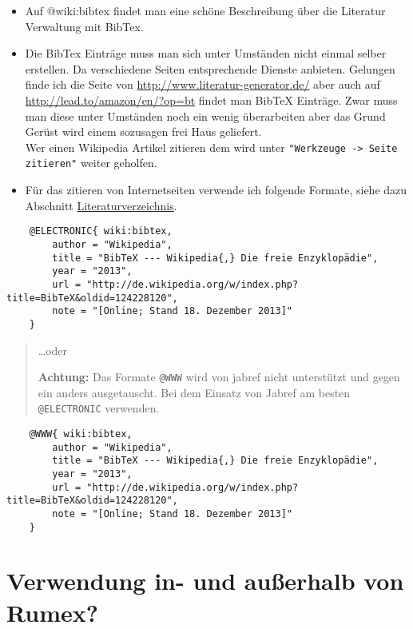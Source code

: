 \begin{itemize}
\item
  Auf @wiki:bibtex findet man eine schöne Beschreibung über die
  Literatur Verwaltung mit BibTex.
\item
  Die BibTex Einträge muss man sich unter Umständen nicht einmal selber
  erstellen. Da verschiedene Seiten entsprechende Dienste anbieten.
  Gelungen finde ich die Seite von
  \url{http://www.literatur-generator.de/} aber auch auf
  \url{http://lead.to/amazon/en/?op=bt} findet man BibTeX Einträge. Zwar
  muss man diese unter Umständen noch ein wenig überarbeiten aber das
  Grund Gerüst wird einem sozusagen frei Haus geliefert.\\Wer einen
  Wikipedia Artikel zitieren dem wird unter
  \texttt{"Werkzeuge -\textgreater{} Seite zitieren"} weiter geholfen.
\item
  Für das zitieren von Internetseiten verwende ich folgende Formate,
  siehe dazu Abschnitt
  \hyperref[literaturverzeichnis]{Literaturverzeichnis}.
\end{itemize}

\begin{verbatim}
    @ELECTRONIC{ wiki:bibtex,
        author = "Wikipedia",
        title = "BibTeX --- Wikipedia{,} Die freie Enzyklopädie",
        year = "2013",
        url = "http://de.wikipedia.org/w/index.php?title=BibTeX&oldid=124228120", 
        note = "[Online; Stand 18. Dezember 2013]"
    }
\end{verbatim}

\begin{quote}
\ldots{}oder

\textbf{Achtung:} Das Formate \texttt{@WWW} wird von jabref nicht
unterstützt und gegen ein anders ausgetauscht. Bei dem Einsatz von
Jabref am besten \texttt{@ELECTRONIC} verwenden.
\end{quote}

\begin{verbatim}
    @WWW{ wiki:bibtex,
        author = "Wikipedia",
        title = "BibTeX --- Wikipedia{,} Die freie Enzyklopädie",
        year = "2013",
        url = "http://de.wikipedia.org/w/index.php?title=BibTeX&oldid=124228120", 
        note = "[Online; Stand 18. Dezember 2013]"
    }
\end{verbatim}

\section{Verwendung in- und außerhalb von
Rumex?}\label{verwendung-in--und-auuxdferhalb-von-rumex}

